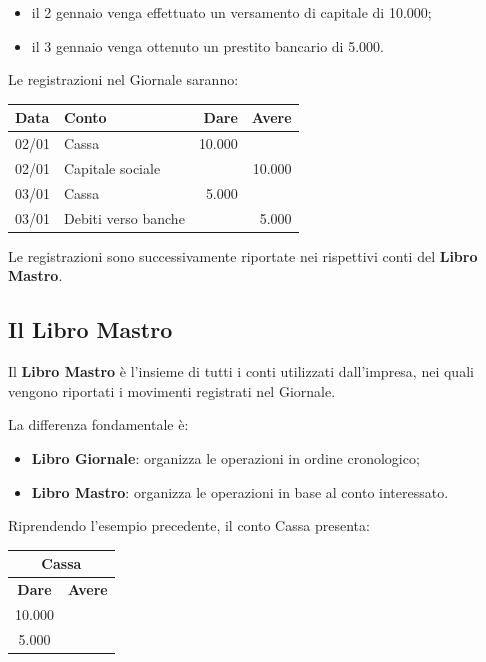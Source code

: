 \begin{itemize}
    \item il 2 gennaio venga effettuato
    un versamento di capitale di 10.000;

    \item il 3 gennaio venga ottenuto
    un prestito bancario di 5.000.
\end{itemize}

\noindent Le registrazioni nel Giornale saranno:

\begin{center}
\begin{tabular}{|l|l|r|r|}
\hline
\textbf{Data} &
\textbf{Conto} &
\textbf{Dare} &
\textbf{Avere} \\
\hline
02/01 & Cassa & 10.000 & \\
\hline
02/01 & Capitale sociale & & 10.000 \\
\hline
03/01 & Cassa & 5.000 & \\
\hline
03/01 & Debiti verso banche & & 5.000 \\
\hline
\end{tabular}
\end{center}

\noindent Le registrazioni sono successivamente
riportate nei rispettivi conti del
\textbf{Libro Mastro}.


\subsection{Il Libro Mastro}

\noindent Il \textbf{Libro Mastro} è l'insieme
di tutti i conti utilizzati dall'impresa,
nei quali vengono riportati i movimenti
registrati nel Giornale.

\medskip

\noindent La differenza fondamentale è:

\begin{itemize}
    \item \textbf{Libro Giornale}: organizza
    le operazioni in ordine cronologico;

    \item \textbf{Libro Mastro}: organizza
    le operazioni in base al conto interessato.
\end{itemize}

\noindent Riprendendo l'esempio precedente,
il conto Cassa presenta:

\begin{center}
\begin{tabular}{c|c}
\multicolumn{2}{c}{\textbf{Cassa}} \\
\hline
\textbf{Dare} & \textbf{Avere} \\
\hline
10.000 & \\
5.000 & \\
\hline
\end{tabular}
\end{center}


